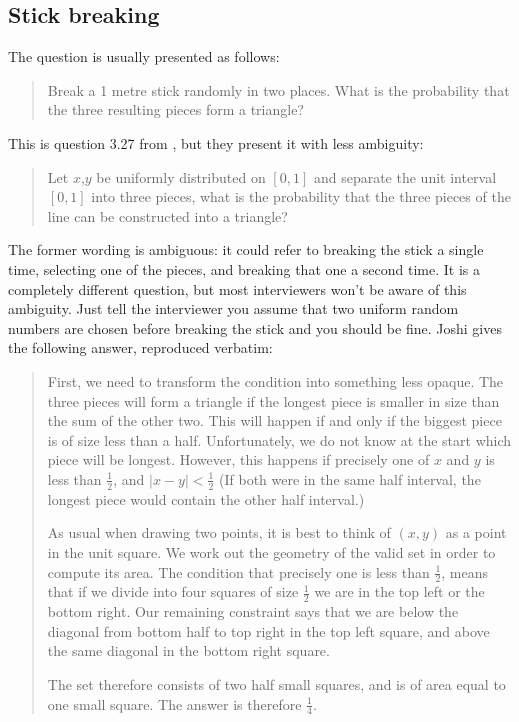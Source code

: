 \documentclass[a4paper]{article}
\begin{document}
\subsection{Stick breaking}
\label{subsec:stickbreaking}
The question is usually presented as follows:
\begin{quote}
Break a 1 metre stick randomly in two places. What is the probability that the three resulting pieces form a triangle?
\end{quote}
This is question 3.27 from \citet{JoshiQA}, but they present it with less ambiguity:
\begin{quote}
Let $x$,$y$ be uniformly distributed on $[0, 1]$ and separate the
unit interval $[0,1]$ into three pieces, what is the probability that the three pieces of the
line can be constructed into a triangle?
\end{quote}
The former wording is ambiguous: it could refer to breaking the stick a single time, selecting one of the pieces, and breaking that one a second time.
It is a completely different question, but most interviewers won't be aware of this ambiguity.
Just tell the interviewer you assume that two uniform random numbers are chosen before breaking the stick and you should be fine.
Joshi gives the following answer, reproduced verbatim:
\begin{quotation}
First, we need to transform the condition into something less opaque.
The three pieces will form a triangle if the longest piece is smaller in size than the sum of the other two.
This will happen if and only if the biggest piece is of size less than a half.
Unfortunately, we do not know at the start which piece will be longest.
However, this happens if precisely one of $x$ and $y$ is less than $\frac{1}{2}$, and $|x-y|<\frac{1}{2}$ (If both were in the same half interval, the longest piece would contain the other half interval.)

As usual when drawing two points, it is best to think of $(x,y)$ as a point in the unit square.
We work out the geometry of the valid set in order to compute its area.
The condition that precisely one is less than $\frac{1}{2}$, means that if we divide into  four squares of size $\frac{1}{2}$ we are in the top left or the bottom right.
Our remaining constraint says that we are below the diagonal from bottom half to top right in
the top left square, and above the same diagonal in the bottom right square.

The set therefore consists of two half small squares, and is of area equal to one small square.
The answer is therefore $\frac{1}{4}$.
\end{quotation}
\end{document}
